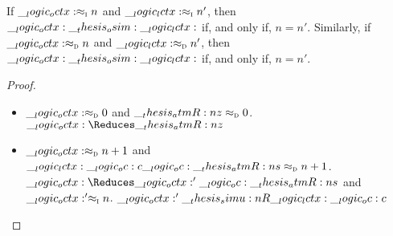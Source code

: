 \begin{theorem}
  If $\ainc{\octx}{n}$ and $\eainc{\lctx}{n'}$, then $\octx \osim \lctx$ if, and only if, $n = n'$.
  Similarly, if $\adec{\octx}{n}$ and $\eadec{\lctx}{n'}$, then $\octx \osim \lctx$ if, and only if, $n = n'$.
\end{theorem}

\begin{proof}
  \begin{itemize}
  \item
    $\adec{\octx}{0}$ and $\eadec{\atmR{z}}{0}$.
    $\octx \Reduces \atmR{z}$
  \item 
    $\adec{\octx}{n+1}$ and $\eadec{\lctx \oc c \oc \atmR{s}}{n+1}$.
    $\octx \Reduces \octx' \oc \atmR{s}$ and $\ainc{\octx'}{n}$.
    $\octx' \simu{R} \lctx \oc c$
  \end{itemize}
\end{proof}



      

